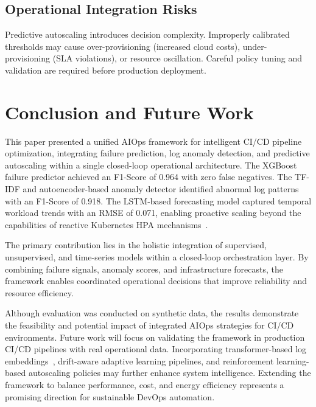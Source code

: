 \documentclass[conference]{IEEEtran}
\begin{document}
\subsection{Operational Integration Risks}

Predictive autoscaling introduces decision complexity. Improperly calibrated thresholds may cause over-provisioning (increased cloud costs), under-provisioning (SLA violations), or resource oscillation. Careful policy tuning and validation are required before production deployment.

\section{Conclusion and Future Work}

This paper presented a unified AIOps framework for intelligent CI/CD pipeline optimization, integrating failure prediction, log anomaly detection, and predictive autoscaling within a single closed-loop operational architecture. The XGBoost failure predictor achieved an F1-Score of 0.964 with zero false negatives. The TF-IDF and autoencoder-based anomaly detector identified abnormal log patterns with an F1-Score of 0.918. The LSTM-based forecasting model captured temporal workload trends with an RMSE of 0.071, enabling proactive scaling beyond the capabilities of reactive Kubernetes HPA mechanisms~\cite{kubernetesDocs}.

The primary contribution lies in the holistic integration of supervised, unsupervised, and time-series models within a closed-loop orchestration layer. By combining failure signals, anomaly scores, and infrastructure forecasts, the framework enables coordinated operational decisions that improve reliability and resource efficiency.

Although evaluation was conducted on synthetic data, the results demonstrate the feasibility and potential impact of integrated AIOps strategies for CI/CD environments. Future work will focus on validating the framework in production CI/CD pipelines with real operational data. Incorporating transformer-based log embeddings~\cite{le2022log}, drift-aware adaptive learning pipelines, and reinforcement learning-based autoscaling policies may further enhance system intelligence. Extending the framework to balance performance, cost, and energy efficiency represents a promising direction for sustainable DevOps automation.



\end{document}
